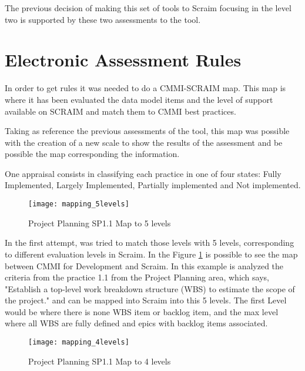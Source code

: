 The previous decision of making this set of tools to Scraim focusing in the level two is supported by these two assessments to the tool.



\section{Electronic Assessment Rules} \label{sec:mapping}
In order to get rules it was needed to do a CMMI-SCRAIM map. 
This map is where it has been evaluated the data model items and the level of support available on SCRAIM and match them to CMMI best practices.

Taking as reference the previous assessments of the tool, this map was possible with the creation of a new scale to show the results of the assessment and be possible the map corresponding the information.

One appraisal consists in classifying each practice in one of four states: Fully Implemented, Largely Implemented, Partially implemented and Not implemented.

\begin{figure}[h]
	\begin{center}
		\leavevmode
		\texttt{[image: mapping\_5levels]}
		\caption{Project Planning SP1.1 Map to 5 levels}
		\label{fig:mapping_5levels}
	\end{center}
\end{figure}

In the first attempt, was tried to match those levels with 5 levels, corresponding to different evaluation levels in Scraim. In the Figure \ref{fig:mapping_5levels} is possible to see the map between CMMI for Development and Scraim. In this example is analyzed the criteria from the practice 1.1 from the Project Planning area, which says, "Establish a top-level work breakdown structure (WBS) to estimate the scope of the project." and can be mapped into Scraim into this 5 levels. The first Level would be where there is none WBS item or backlog item, and the max level where all WBS are fully defined and epics with backlog items associated. 

\begin{figure}[h]
	\begin{center}
		\leavevmode
		\texttt{[image: mapping\_4levels]}
		\caption{Project Planning SP1.1 Map to 4 levels}
		\label{fig:mapping_4levels}
	\end{center}
\end{figure}

